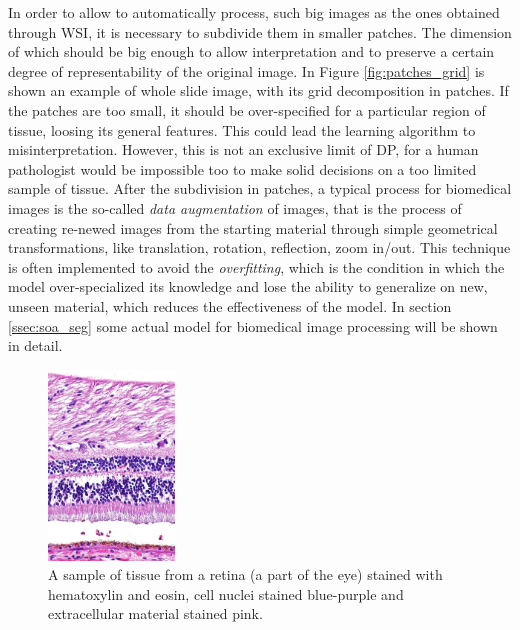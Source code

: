 In order to allow to automatically process, such big images as the ones obtained through WSI, it is necessary to subdivide them in smaller patches. The dimension of which should be big enough to allow interpretation and to preserve a certain degree of representability of the original image. In Figure \ref{fig:patches_grid} is shown an example of whole slide image, with its grid decomposition in patches. If the patches are too small, it should be over-specified for a particular region of tissue, loosing its general features. This could lead the learning algorithm to misinterpretation. However, this is not an exclusive limit of DP, for a human pathologist would be impossible too to make solid decisions on a too limited sample of tissue. After the subdivision in patches, a typical process for biomedical images is the so-called \textit{data augmentation} of images, that is the process of creating re-newed images from the starting material through simple geometrical transformations, like translation, rotation, reflection, zoom in/out. This technique is often implemented to avoid the \textit{overfitting}, which is the condition in which the model over-specialized its knowledge and lose the ability to generalize on new, unseen material, which reduces the effectiveness of the model. In section \ref{ssec:soa_seg} some actual model for biomedical image processing will be shown in detail.

 \begin{figure}
     \centering
     \includegraphics[width = 0.3\textwidth]{images/h&e_retyna}
     \caption{A sample of tissue from a retina (a part of the eye) stained with hematoxylin and eosin, cell nuclei stained blue-purple and extracellular material stained pink.}
     \label{fig:he_retyna}
 \end{figure}

